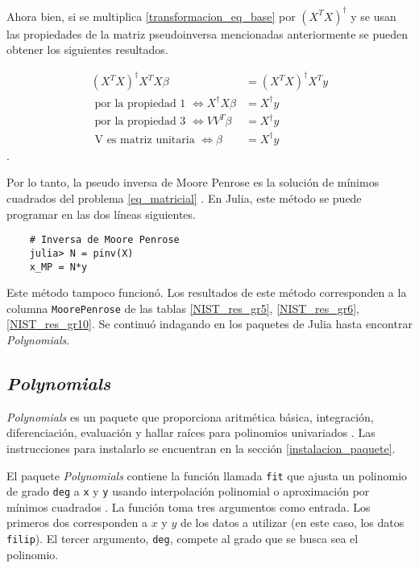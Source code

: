 Ahora bien, si se multiplica \ref{transformacion_eq_base} por $(X^{T}X)^{\dagger}$ y se usan las propiedades de la matriz pseudoinversa mencionadas anteriormente se pueden obtener los siguientes resultados. 

\begin{equation*}
    \begin{aligned}
    (X^{T}X)^{\dagger} X^{T}X \beta &= (X^{T}X)^{\dagger} X^{T} y \\
    \text{ por la propiedad 1 }\iff X^{\dagger} X \beta &= X^{\dagger} y \\
    \text{ por la propiedad 3 } \iff V V^{T} \beta &= X^{\dagger} y \\
    \text{ V es matriz unitaria } \iff \beta &= X^{\dagger} y 
    \end{aligned}
\end{equation*}. 

Por lo tanto, la pseudo inversa de Moore Penrose es la solución de mínimos cuadrados del problema \ref{eq_matricial} \citep{worldScientificNews}. En Julia, este método se puede programar en las dos líneas siguientes. 

\begin{verbatim}
    # Inversa de Moore Penrose
    julia> N = pinv(X)
    x_MP = N*y 
\end{verbatim}

Este método tampoco funcionó. Los resultados de este método corresponden a la columna \texttt{MoorePenrose} de las tablas \ref{NIST_res_gr5}, \ref{NIST_res_gr6}, \ref{NIST_res_gr10}. Se continuó indagando en los paquetes de Julia hasta encontrar \textit{Polynomials}. 

\subsection{\textit{Polynomials}}
\textit{Polynomials} es un paquete que proporciona aritmética básica, integración, diferenciación, evaluación y hallar raíces para polinomios univariados \citep{poly_manual}. Las instrucciones para instalarlo se encuentran en la sección \ref{instalacion_paquete}. 


El paquete \textit{Polynomials} contiene la función llamada \texttt{fit} que ajusta un polinomio de grado \texttt{deg} a \texttt{x} y \texttt{y} usando interpolación polinomial o aproximación por mínimos cuadrados \citep{poly_manual}. La función toma tres argumentos como entrada. Los primeros dos corresponden a $x$ y $y$ de los datos a utilizar (en este caso, los datos \texttt{filip}). El tercer argumento, \texttt{deg},  compete al grado que se busca sea el polinomio. 

